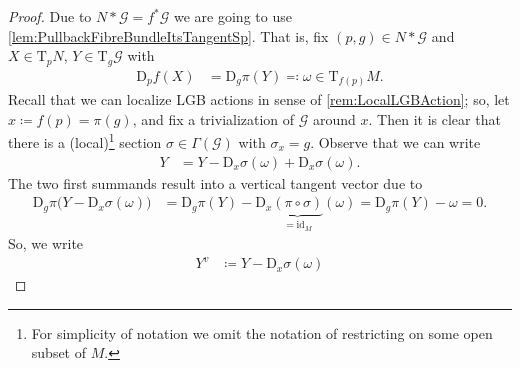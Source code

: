 \documentclass[reqno,a4paper,oneside]{amsart}
\theoremstyle{plain}
\theoremstyle{remark}
\newtheorem{remark}[theorem]{Remarks}
\theoremstyle{definition}
\begin{document}

\begin{proof}
Due to $N*\mathcal{G} = f^*\mathcal{G}$ we are going to use \ref{lem:PullbackFibreBundleItsTangentSp}. That is, fix $(p, g) \in N*\mathcal{G}$ and $X \in \mathrm{T}_pN$, $Y \in \mathrm{T}_g \mathcal{G}$ with
\begin{align*}
\mathrm{D}_p f(X) &= \mathrm{D}_g\pi(Y) \eqqcolon \omega \in \mathrm{T}_{f(p)}M.
\end{align*}
Recall that we can localize LGB actions in sense of \ref{rem:LocalLGBAction}; so, let $x \coloneqq f(p) = \pi(g)$, and fix a trivialization of $\mathcal{G}$ around $x$. Then it is clear that there is a (local)\footnote{For simplicity of notation we omit the notation of restricting on some open subset of $M$.} section $\sigma \in \Gamma(\mathcal{G})$ with $\sigma_x = g$. Observe that we can write
\begin{align*}
Y
&=
Y 
	- \mathrm{D}_x \sigma (\omega)
	+ \mathrm{D}_x \sigma (\omega).
\end{align*}
The two first summands result into a vertical tangent vector due to
\begin{align*}
\mathrm{D}_g\pi\bigl( Y - \mathrm{D}_x\sigma(\omega) \bigr)
&=
\mathrm{D}_g\pi( Y ) - \mathrm{D}_x\underbrace{(\pi \circ \sigma)}_{= \mathrm{id}_M}(\omega)
=
\mathrm{D}_g \pi (Y) - \omega
=
0.
\end{align*}
So, we write 
\begin{align*}
Y^v
&\coloneqq
Y - \mathrm{D}_x \sigma(\omega)
\end{align*}

\end{proof}
\end{document}
